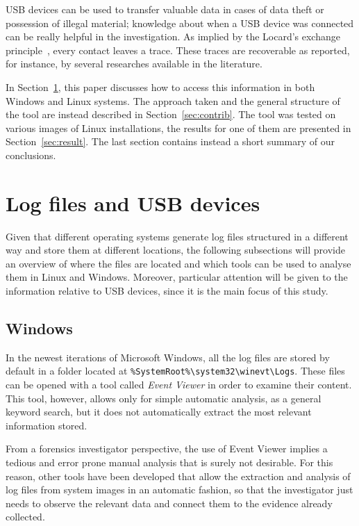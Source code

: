 \documentclass[a4paper,twocolumn]{article}
\begin{document}
USB devices can be used to transfer valuable data in cases of data theft or
possession of illegal material; knowledge about when a USB device was connected
can be really helpful in the investigation. As implied by the Locard's exchange
principle~\cite{locard2008locard}, every contact leaves a trace. These traces
are recoverable as reported, for instance, by several researches available in
the literature.~\cite{Tanushree12,Abhijeet14}

In Section~\ref{sec:lit}, this paper discusses how to access this information in
both Windows and Linux systems. The approach taken and the general structure of
the tool are instead described in Section~\ref{sec:contrib}. The tool was tested
on various images of Linux installations, the results for one of them are
presented in Section~\ref{sec:result}. The last section contains instead a short
summary of our conclusions.

\section{Log files and USB devices}
\label{sec:lit}

Given that different operating systems generate log files structured in a
different way and store them at different locations, the following subsections
will provide an overview of where the files are located and which tools can
be used to analyse them in Linux and Windows. Moreover, particular attention
will be given to the information relative to USB devices, since it is the main
focus of this study.

\subsection{Windows}\label{sec:litWindows}
In the newest iterations of Microsoft Windows, all the log files are stored by
default in a folder located at
\texttt{\%SystemRoot\%\textbackslash{}system32\textbackslash{}winevt\textbackslash{}Logs}.
These files can be opened with a tool called \emph{Event Viewer} in order to
examine their content. This tool, however, allows only for simple automatic
analysis, as a general keyword search, but it does not automatically extract
the most relevant information stored.

From a forensics investigator perspective, the use of Event Viewer implies a
tedious and error prone manual analysis that is surely not desirable. For this
reason, other tools have been developed that allow the extraction and analysis
of log files from system images in an automatic fashion, so that the
investigator just needs to observe the relevant data and connect them to the
evidence already collected.
\end{document}
